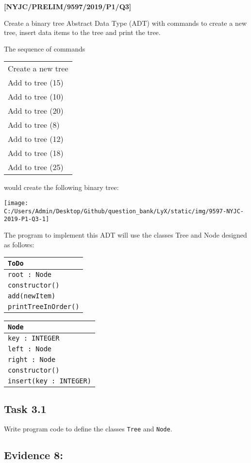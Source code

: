 \item \textbf{{[}NYJC/PRELIM/9597/2019/P1/Q3{]} }

Create a binary tree Abstract Data Type (ADT) with commands to create
a new tree, insert data items to the tree and print the tree. 

The sequence of commands 
\noindent \begin{center}
\begin{tabular}{l}
Create a new tree\tabularnewline
Add to tree (15) \tabularnewline
Add to tree (10) \tabularnewline
Add to tree (20) \tabularnewline
Add to tree (8) \tabularnewline
Add to tree (12) \tabularnewline
Add to tree (18) \tabularnewline
Add to tree (25)\tabularnewline
\end{tabular}
\par\end{center}

would create the following binary tree: 
\begin{center}
\texttt{[image: C:/Users/Admin/Desktop/Github/question\_bank/LyX/static/img/9597-NYJC-2019-P1-Q3-1]}
\par\end{center}

The program to implement this ADT will use the classes Tree and Node
designed as follows: 
\begin{center}
\begin{tabular}{|l|}
\hline 
\texttt{ToDo}\tabularnewline
\hline 
\texttt{root : Node}\tabularnewline
\hline 
\texttt{constructor()}\tabularnewline
\texttt{add(newItem)}\tabularnewline
\texttt{printTreeInOrder()}\tabularnewline
\hline 
\end{tabular}%
\begin{tabular}{|l|}
\hline 
\texttt{Node}\tabularnewline
\hline 
\texttt{key : INTEGER}\tabularnewline
\texttt{left : Node}\tabularnewline
\texttt{right : Node}\tabularnewline
\hline 
\texttt{constructor()}\tabularnewline
\texttt{insert(key : INTEGER)}\tabularnewline
\hline 
\end{tabular}
\par\end{center}

\subsection*{Task 3.1 }

Write program code to define the classes \texttt{Tree} and \texttt{Node}.

\subsection*{Evidence 8: }

